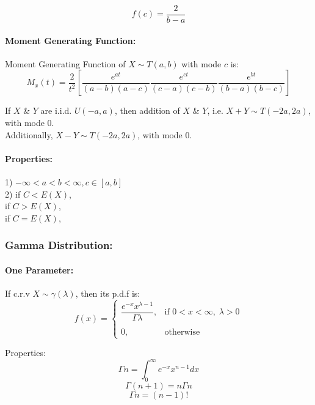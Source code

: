 \documentclass[
10pt, %
a4paper, %
]{report}
\begin{document}
\[
f(c)=\frac{2}{b-a}
\]

\paragraph*{Moment Generating Function:}
Moment Generating Function of \(X\sim T(a, b)\) with mode \(c\) is:
\[
M_x(t)=\frac{2}{t^2}\left[\frac{e^{at}}{(a-b)(a-c)}\frac{e^{ct}}{(c-a)(c-b)}\frac{e^{bt}}{(b-a)(b-c)}\right]
\]

If \(X\) \& \(Y\) are i.i.d. \(U(-a, a)\), then addition of \(X\) \& \(Y\), i.e. \(X+Y\sim T(-2a, 2a)\), with mode \(0\). \\
Additionally, \(X-Y\sim T(-2a, 2a)\), with mode \(0\).

\paragraph*{Properties:}
1) \(- \infty < a < b < \infty, c \in [a, b]\) \\
2) if \(C < E(X)\),  \\
    if \(C > E(X)\),  \\
    if \(C=E(X)\), 


\newpage

\subsubsection*{Gamma Distribution:}
\paragraph*{One Parameter:}
If c.r.v \(X\sim \gamma(\lambda)\), then its p.d.f is:
\[
    f(x)= 
\begin{cases}
    \dfrac{e^{-x} x^{\lambda -1}}{\Gamma \lambda}, & \text{if } 0<  x < \infty,\;\lambda >0\\ \\
    0,                                     & \text{otherwise}
\end{cases}
\]

Properties:
\[
\Gamma n = \int_0^\infty e^{-x} x^{n -1} dx
\]
\[
\Gamma (n+1) = n \Gamma n
\]
\[
\Gamma n = (n-1)!
\]
\end{document}

